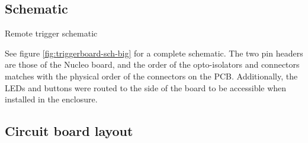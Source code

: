 \subsection{Schematic}

{Remote trigger schematic}

See figure \ref{fig:triggerboard-sch-big} for a complete schematic.
The two pin headers are those of the Nucleo board, and the order of the opto-isolators and connectors matches with the physical order of the connectors on the PCB.
Additionally, the LEDs and buttons were routed to the side of the board to be accessible when installed in the enclosure.

\subsection{Circuit board layout}

